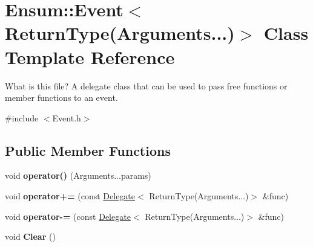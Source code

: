 \hypertarget{class_ensum_1_1_event_3_01_return_type_07_arguments_8_8_8_08_4}{}\section{Ensum\+:\+:Event$<$ Return\+Type(Arguments...)$>$ Class Template Reference}
\label{class_ensum_1_1_event_3_01_return_type_07_arguments_8_8_8_08_4}


What is this file? A delegate class that can be used to pass free functions or member functions to an event.  




{\ttfamily \#include $<$Event.\+h$>$}

\subsection*{Public Member Functions}
\begin{DoxyCompactItemize}
\item 
void {\bfseries operator()} (Arguments...\+params)\hypertarget{class_ensum_1_1_event_3_01_return_type_07_arguments_8_8_8_08_4_add7c448f8cc9a82ee4f3a533f549f092}{}\label{class_ensum_1_1_event_3_01_return_type_07_arguments_8_8_8_08_4_add7c448f8cc9a82ee4f3a533f549f092}

\item 
void {\bfseries operator+=} (const \hyperlink{class_ensum_1_1_delegate}{Delegate}$<$ Return\+Type(Arguments...)$>$ \&func)\hypertarget{class_ensum_1_1_event_3_01_return_type_07_arguments_8_8_8_08_4_a9d0c7cffb5c1b1340f312a88fd3f06ce}{}\label{class_ensum_1_1_event_3_01_return_type_07_arguments_8_8_8_08_4_a9d0c7cffb5c1b1340f312a88fd3f06ce}

\item 
void {\bfseries operator-\/=} (const \hyperlink{class_ensum_1_1_delegate}{Delegate}$<$ Return\+Type(Arguments...)$>$ \&func)\hypertarget{class_ensum_1_1_event_3_01_return_type_07_arguments_8_8_8_08_4_a17b8e30ebf66d670d9afc31568b64c01}{}\label{class_ensum_1_1_event_3_01_return_type_07_arguments_8_8_8_08_4_a17b8e30ebf66d670d9afc31568b64c01}

\item 
void {\bfseries Clear} ()\hypertarget{class_ensum_1_1_event_3_01_return_type_07_arguments_8_8_8_08_4_ac2079482906c55a1d66ec3c19502804d}{}\label{class_ensum_1_1_event_3_01_return_type_07_arguments_8_8_8_08_4_ac2079482906c55a1d66ec3c19502804d}

\end{DoxyCompactItemize}
